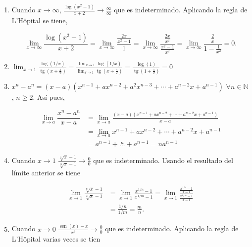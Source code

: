 \documentclass[
  spanish,
  a4paper,
]{scrreport}
\theoremstyle{definition}
\theoremstyle{remark}
\begin{document}
\begin{tcolorbox}
\begin{enumerate}
  de modo que, como \(\lim_{x\to\infty}\frac{2}{e^{3x/2}}=0\), aplicando
  el teorema de compresión de funciones se tiene que
  \(\lim_{x\to\infty} \frac{x}{e^{2x}}=0\).

  Usando este resultado se tiene,

  \[\lim_{x\to\infty}\dfrac{x^2-3x+2}{e^{2x}} = \lim_{x\to\infty}\dfrac{x^2}{e^{2x}}-3\lim_{x\to\infty} \frac{x}{e^{2x}} + \lim_{x\to\infty} \frac{2}{e^{2x}} = 0.
  \]
\item
  Cuando \(x\to\infty\),
  \(\frac{\log(x^2-1)}{x+2}\to \frac{\infty}{\infty}\) que es
  indeterminado. Aplicando la regla de L'Hôpital se tiene,

  \[
  \lim_{x\to\infty}\dfrac{\log(x^2-1)}{x+2} =\lim_{x\to\infty}\frac{\frac{2x}{x^2-1}}{1} = \lim_{x\to\infty}\frac{\frac{2x}{x^2}}{\frac{x^2-1}{x^2}} = \lim_{x\to\infty}\frac{\frac{2}{x}}{1-\frac{1}{x^2}} = 0.
  \]
\item
  \(\displaystyle \lim_{x\to 1}\frac{\log(1/x)}{\operatorname{tg}(x+\frac{\pi}{2})} = \frac{\lim_{x\to 1}\log(1/x)}{\lim_{x\to 1}\operatorname{tg}(x+\frac{\pi}{2})} = \frac{\log(1)}{\operatorname{tg}(1+\frac{\pi}{2})}=0\)
\item
  \(x^n-a^n = (x-a)(x^{n-1}+ax^{n-2}+a^2x^{n-3}+\cdots + a^{n-2}x+a^{n-1})\)
  \(\forall n\in\mathbb{N}\), \(n\geq 2\). Así pues,

  \begin{align*}
  \lim_{x\to a}\dfrac{x^n-a^n}{x-a} &= \lim_{x\to a}\frac{(x-a)(x^{n-1}+ax^{n-2}+\cdots + a^{n-2}x+a^{n-1})}{x-a} \\ 
  &= \lim_{x\to a} x^{n-1}+ax^{n-2}+\cdots + a^{n-2}x+a^{n-1}\\  
  &= a^{n-1}+\stackrel{n}{\dots}+a^{n-1} = na^{n-1}
  \end{align*}
\item
  Cuando \(x\to 1\)
  \(\frac{\sqrt[n]{x}-1}{\sqrt[m]{x}-1}\to \frac{0}{0}\) que es
  indeterminado. Usando el resultado del límite anterior se tiene

  \begin{align*}
  \lim_{x\to 1}\frac{\sqrt[n]{x}-1}{\sqrt[m]{x}-1} 
  &= \lim_{x\to 1}\frac{x^{1/n}-1}{x^{1/m}-1} 
  = \lim_{x\to 1}\frac{\frac{x^{1/n}-1}{x-1}}{\frac{x^{1/m}-1}{x-1}} \\
  &= \frac{1/n}{1/m}   
  = \frac{m}{n}.
  \end{align*}
\item
  Cuando \(x\to 0\)
  \(\frac{\operatorname{sen}(x)-x}{x^3}\to \frac{0}{0}\) que es
  indeterminado. Aplicando la regla de L'Hôpital varias veces se tien


\end{enumerate}
\end{tcolorbox}
\end{document}
